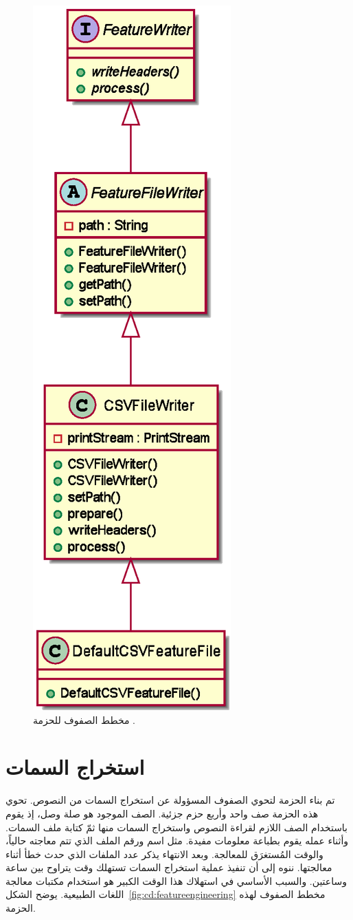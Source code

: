 \begin{figure}[htb]
	\centering
	\includegraphics[width=0.25\linewidth]{images/cd-writers.eps}
	\caption{%
		مخطط الصفوف للحزمة .
	}
	\label{fig:cd:writers}
\end{figure}

\afterpage{\clearpage}






\section{استخراج السمات}
تم بناء الحزمة  لتحوي الصفوف المسؤولة عن استخراج السمات من النصوص.
تحوي هذه الحزمة صف واحد وأربع حزم جزئية.
الصف الموجود  هو صلة وصل،
إذ يقوم باستخدام الصف اللازم لقراءة النصوص واستخراج السمات منها ثمّ كتابة ملف السمات.
وأثناء عمله يقوم بطباعة معلومات مفيدة.
مثل اسم ورقم الملف الذي تتم معاجته حالياً، والوقت المُستغرَق للمعالجة.
وبعد الانتهاء يذكر عدد الملفات الذي حدث خطأ أثناء معالجتها.
ننوه إلى أن تنفيذ عملية استخراج السمات تستهلك وقت يتراوح بين ساعة وساعتين.
والسبب الأساسي في استهلاك هذا الوقت الكبير هو استخدام مكتبات معالجة اللغات الطبيعية.
يوضح الشكل~\ref{fig:cd:featureengineering} مخطط الصفوف لهذه الحزمة.

